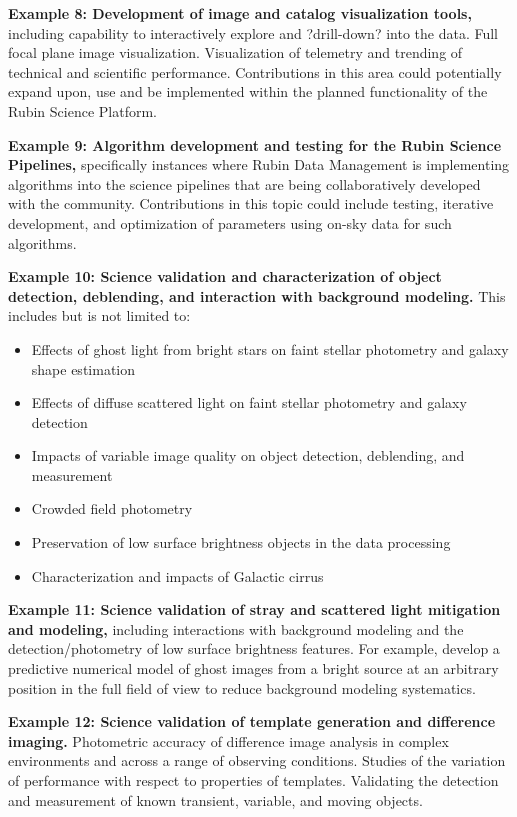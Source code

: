 \documentclass[SE,authoryear,toc]{lsstdoc}
\begin{document}
\textbf{Example 8: Development of image and catalog visualization tools,} including capability to interactively explore and ?drill-down? into the data. Full focal plane image visualization. Visualization of telemetry and trending of technical and scientific performance. Contributions in this area could potentially expand upon, use and be implemented within the planned functionality of the Rubin Science Platform.

\textbf{Example 9: Algorithm development and testing for the Rubin Science Pipelines,} specifically instances where Rubin Data Management is implementing algorithms into the science pipelines that are being collaboratively developed with the community. Contributions in this topic could include testing, iterative development, and optimization of parameters using on-sky data for such algorithms.

\textbf{Example 10: Science validation and characterization of object detection, deblending, and interaction with background modeling.} This includes but is not limited to:
\begin{itemize}
\item Effects of ghost light from bright stars on faint stellar photometry and galaxy shape estimation
\item Effects of diffuse scattered light on faint stellar photometry and galaxy detection
\item Impacts of variable image quality on object detection, deblending, and measurement
\item Crowded field photometry
\item Preservation of low surface brightness objects in the data processing
\item Characterization and impacts of Galactic cirrus
\end{itemize}

\textbf{Example 11: Science validation of stray and scattered light mitigation and modeling,} including interactions with background modeling and the detection/photometry of low surface brightness features. For example, develop a predictive numerical model of ghost images from a bright source at an arbitrary position in the full field of view to reduce background modeling systematics.

\textbf{Example 12: Science validation of template generation and difference imaging.} Photometric accuracy of difference image analysis in complex environments and across a range of observing conditions. Studies of the variation of performance with respect to properties of templates. Validating the detection and measurement of known transient, variable, and moving objects.
\end{document}
